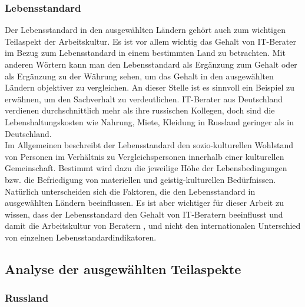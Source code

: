 \subsubsection{Lebensstandard}
Der Lebensstandard in den ausgewählten Ländern gehört auch zum wichtigen Teilaspekt der Arbeitskultur. Es ist vor allem wichtig das Gehalt von IT-Berater im Bezug zum Lebensstandard in einem bestimmten Land zu betrachten. Mit anderen Wörtern kann man den Lebensstandard als Ergänzung zum Gehalt oder als Ergänzung zu der Währung sehen, um das Gehalt in den ausgewählten Ländern objektiver zu vergleichen. An dieser Stelle ist es sinnvoll ein Beispiel zu erwähnen, um den Sachverhalt zu verdeutlichen. IT-Berater aus Deutschland verdienen durchschnittlich mehr als ihre russischen Kollegen, doch sind die Lebenshaltungskosten wie Nahrung, Miete, Kleidung in Russland geringer als in Deutschland.\\
Im Allgemeinen beschreibt der Lebensstandard den sozio-kulturellen Wohlstand von Personen im Verhältnis zu Vergleichspersonen innerhalb einer kulturellen Gemeinschaft. Bestimmt wird dazu die jeweilige Höhe der Lebensbedingungen bzw. die Befriedigung von materiellen und geistig-kulturellen Bedürfnissen. \cite{LbsWiki} \\
Natürlich unterscheiden sich die Faktoren, die den Lebensstandard in ausgewählten Ländern beeinflussen. Es ist aber wichtiger für dieser Arbeit zu wissen, dass der Lebensstandard den Gehalt von IT-Beratern beeinflusst und damit die Arbeitskultur von Beratern , und nicht den internationalen Unterschied von einzelnen Lebensstandardindikatoren.

\subsection{Analyse der ausgewählten Teilaspekte}

	\subsubsection{Russland}

